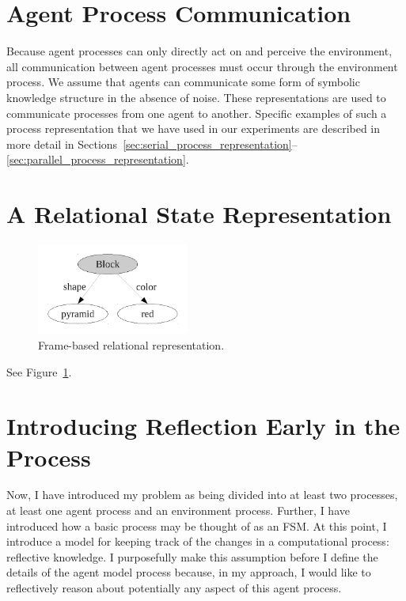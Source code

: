 \section{Agent Process Communication}

Because agent processes can only directly act on and perceive the
environment, all communication between agent processes must occur
through the environment process.  We assume that agents can
communicate some form of symbolic knowledge structure in the absence
of noise.  These representations are used to communicate processes
from one agent to another.  Specific examples of such a process
representation that we have used in our experiments are described in
more detail in
Sections~\ref{sec:serial_process_representation}--\ref{sec:parallel_process_representation}.


\section{A Relational State Representation}

\begin{figure}[bth]
  \center
  \includegraphics[height=3cm]{gfx/frame_representation}
  \caption[Frame-based relational representation.]{Frame-based relational representation.}
  \label{fig:frame_representation}
\end{figure}

See Figure~\ref{fig:frame_representation}.

\section{Introducing Reflection Early in the Process}

Now, I have introduced my problem as being divided into at least two
processes, at least one agent process and an environment process.
Further, I have introduced how a basic process may be thought of as an
\ac{FSM}.  At this point, I introduce a model for keeping track of the
changes in a computational process: reflective knowledge.  I
purposefully make this assumption before I define the details of the
agent model process because, in my approach, I would like to
reflectively reason about potentially any aspect of this agent
process.

